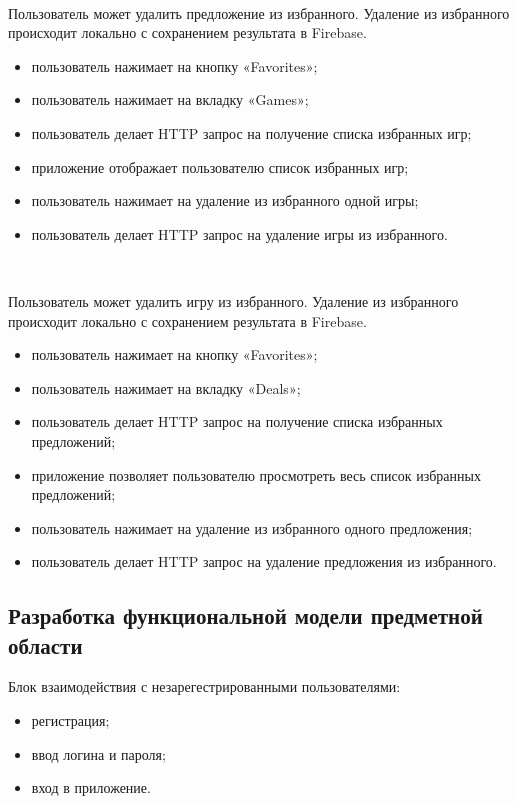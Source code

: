 ~\par
Пользователь может удалить предложение из избранного. Удаление из избранного происходит локально с сохранением результата в Firebase.

\begin{itemize}
  \item пользователь нажимает на кнопку «Favorites»;
  \item пользователь нажимает на вкладку «Games»;
  \item пользователь делает HTTP запрос на получение списка избранных игр;
  \item приложение отображает пользователю список избранных игр;
  \item пользователь нажимает на удаление из избранного одной игры;
  \item пользователь делает HTTP запрос на удаление игры из избранного.
\end{itemize}



~\par
Пользователь может удалить игру из избранного. Удаление из избранного происходит локально с сохранением результата в Firebase.

\begin{itemize}
  \item пользователь нажимает на кнопку «Favorites»;
  \item пользователь нажимает на вкладку «Deals»;
  \item пользователь делает HTTP запрос на получение списка избранных предложений;
  \item приложение позволяет пользователю просмотреть весь список избранных предложений;
  \item пользователь нажимает на удаление из избранного одного предложения;
  \item пользователь делает HTTP запрос на удаление предложения из избранного.
\end{itemize}

\subsection{Разработка функциональной модели предметной области}

Блок взаимодействия с незарегестрированными пользователями:

\begin{itemize}
    \item регистрация;
    \item ввод логина и пароля;
    \item вход в приложение.
\end{itemize}

